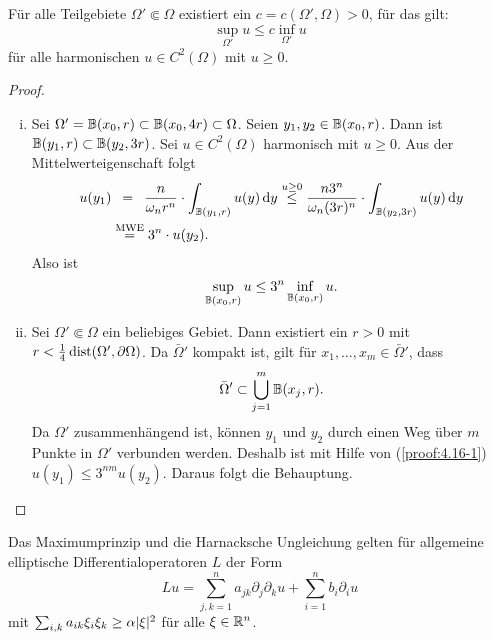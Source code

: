 \begin{theorem}
  \label{theorem:4.16}
  Für alle Teilgebiete $\Omega'\Subset\Omega$ existiert ein $c=c(\Omega',\Omega)>0$, für das gilt:
  \[
  \sup_{\Omega'}u\leq c\inf_{\Omega'}u
  \]
  für alle harmonischen $u\in C^2(\Omega)$ mit $u\geq0$.
\end{theorem}

\begin{proof}
  \begin{enumerate}[(i)]
  \item \label{proof:4.16-1} Sei $\Omega'=\mathbb{B}(x_0,r)\subset\mathbb{B}(x_0,4r)\subset\Omega$. Seien $y_1,y_2\in\mathbb{B}(x_0,r)$. Dann ist $\mathbb{B}(y_1,r)\subset\mathbb{B}(y_2,3r)$. Sei $u\in C^2(\Omega)$ harmonisch mit $u\geq0$. Aus der Mittelwerteigenschaft folgt
    \[
    \begin{split}
      u(y_1)&\ \, =\ \, \frac{n}{\omega_nr^n}\cdot\int_{\mathbb{B}(y_1,r)}u(y)\,\mathrm{d} y\overset{u\geq0}
      \leq\frac{n3^n}{\omega_n(3r)^n}\cdot\int_{\mathbb{B}(y_2,3r)}u(y)\,\mathrm{d} y \\
      &\overset{\scriptsize\text{MWE}}=3^n\cdot u(y_2).
    \end{split}
    \]
    Also ist
    \[\sup_{\mathbb{B}(x_0,r)}u\leq 3^n\inf_{\mathbb{B}(x_0,r)}u.\]
  \item Sei $\Omega'\Subset\Omega$ ein beliebiges Gebiet. Dann existiert ein $r>0$ mit $r<\frac 14\operatorname{dist}(\Omega',\partial\Omega)$. Da $\bar\Omega'$ kompakt ist, gilt für $x_1,\ldots,x_m\in\bar\Omega'$, dass
    \[
    \bar\Omega'\subset\bigcup_{j=1}^m\mathbb{B}(x_j,r).
    \]
    Da $\Omega'$ zusammenhängend ist, können $y_1$ und $y_2$ durch einen Weg über $m$ Punkte in $\Omega'$ verbunden werden. Deshalb ist mit Hilfe von (\ref{proof:4.16-1}) $u(y_1)\leq 3^{nm}u(y_2)$. Daraus folgt die Behauptung.\qedhere
  \end{enumerate}
\end{proof}

\begin{bem}
  Das Maximumprinzip und die Harnacksche Ungleichung gelten für allgemeine elliptische Differentialoperatoren $L$ der Form
  \[
  Lu=\sum_{j,k=1}^na_{jk}\partial_j\partial_ku+\sum_{i=1}^nb_i\partial_iu
  \]
  mit $\sum_{i,k}a_{ik}\xi_i\xi_k\geq\alpha\lvert \xi\rvert^2$ für alle $\xi\in\mathbb{R}^n$.
\end{bem}



